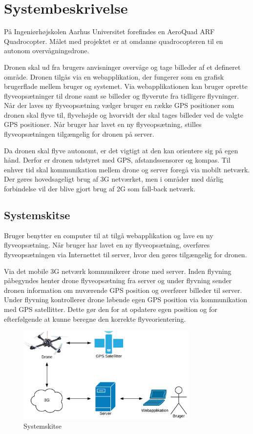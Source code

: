 \chapter{Systembeskrivelse}
\vspace{-1cm}
På Ingeniørhøjskolen Aarhus Universitet forefindes en AeroQuad ARF Quadrocopter. 
Målet med projektet er at omdanne quadrocopteren til en autonom overvågningsdrone.

Dronen skal ud fra brugers anvisninger overvåge og tage billeder af et defineret område. 
Dronen tilgås via en webapplikation, der fungerer som en grafisk brugerflade mellem bruger og systemet.  Via webapplikationen kan bruger oprette flyveopsætninger til drone samt se billeder og flyverute fra tidligere flyvninger.  
Når der laves ny flyveopsætning vælger bruger en række GPS positioner som dronen skal flyve til, flyvehøjde og hvorvidt der skal tages billeder ved de valgte GPS positioner. Når bruger har lavet en ny flyveopsætning, stilles flyveopsætningen tilgængelig for dronen på server.  

Da dronen skal flyve autonomt, er det vigtigt at den kan orientere sig på egen hånd. Derfor er dronen udstyret med GPS, afstandssensorer og kompas.
Til enhver tid skal kommunikation mellem drone og server foregå via mobilt netværk. Der gøres hovedsageligt brug af 3G netværket, men i områder med dårlig forbindelse vil der blive gjort brug af 2G som fall-back netværk. 

\vspace{-0.5cm}

\section*{Systemskitse}
\vspace{-0.5cm}
Bruger benytter en computer til at tilgå webapplikation og lave en ny flyveopsætning. Når bruger har lavet en ny flyveopsætning, overføres flyveopsætningen via Internettet til server, hvor den gøres tilgængelig for dronen.
 
Via det mobile 3G netværk kommunikerer drone med server. 
Inden flyvning påbegyndes henter drone flyveopsætning fra server og under flyvning sender dronen information om nuværende GPS position og overfører billeder til server. 
Under flyvning kontrollerer drone løbende egen GPS position via kommunikation med GPS satellitter. Dette gør den for at opdatere egen position og for efterfølgende at kunne beregne den korrekte flyveorientering. 



\vspace{-5pt}
\begin{figure}[H]
\centering
\includegraphics[width=0.8\textwidth]{Billeder/Projektbeskrivelse.png}
\vspace{-.3cm}
\caption{Systemskitse}
\label{fig:Systemskitse}
\end{figure}